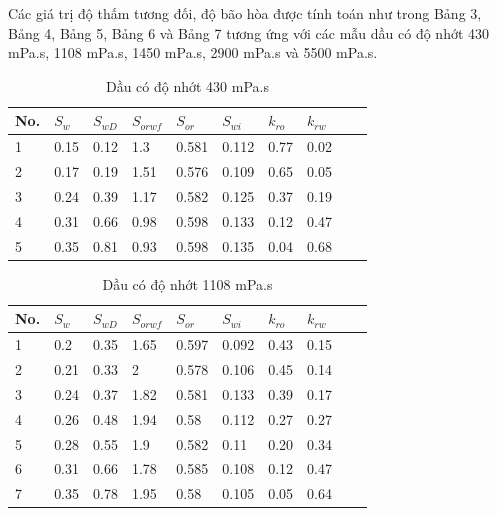 \documentclass[12pt,a4paper]{article}
\begin{document}
	\newline
	Các giá trị độ thấm tương đối, độ bão hòa được tính toán như trong Bảng 3, Bảng 4, Bảng 5, Bảng 6 và Bảng 7 tương ứng với các mẫu dầu có độ nhớt 430 mPa.s, 1108 mPa.s, 1450 mPa.s, 2900 mPa.s và 5500 mPa.s.
\begin{table}[h]
\centering
\caption{Dầu có độ nhớt 430 mPa.s}
\label{my-label}
\begin{tabularx}{\textwidth}{@{}XXXXXXXXXX@{}}
\toprule
No. & $S_w$ & $S_{wD}$ & $S_{orwf}$ & $S_{or}$ & $S_{wi}$ & $k_{ro}$ & $k_{rw}$ \\ \midrule
1   & 0.15  & 0.12     & 1.3        & 0.581    & 0.112    & 0.77     & 0.02     \\
2   & 0.17  & 0.19     & 1.51       & 0.576    & 0.109    & 0.65     & 0.05     \\
3   & 0.24  & 0.39     & 1.17       & 0.582    & 0.125    & 0.37     & 0.19     \\
4   & 0.31  & 0.66     & 0.98       & 0.598    & 0.133    & 0.12     & 0.47     \\
5   & 0.35  & 0.81     & 0.93       & 0.598    & 0.135    & 0.04     & 0.68     \\ \bottomrule
\end{tabularx}
\end{table}
\begin{table}[h]
\centering
\caption{Dầu có độ nhớt 1108 mPa.s}
\label{my-label}
\begin{tabularx}{\textwidth}{@{}XXXXXXXXXX@{}}
\toprule
No. & $S_w$ & $S_{wD}$ & $S_{orwf}$ & $S_{or}$ & $S_{wi}$ & $k_{ro}$ & $k_{rw}$ \\ \midrule
1   & 0.2   & 0.35     & 1.65       & 0.597    & 0.092    & 0.43     & 0.15     \\
2   & 0.21  & 0.33     & 2          & 0.578    & 0.106    & 0.45     & 0.14     \\
3   & 0.24  & 0.37     & 1.82       & 0.581    & 0.133    & 0.39     & 0.17     \\
4   & 0.26  & 0.48     & 1.94       & 0.58     & 0.112    & 0.27     & 0.27     \\
5   & 0.28  & 0.55     & 1.9        & 0.582    & 0.11     & 0.20     & 0.34     \\
6   & 0.31  & 0.66     & 1.78       & 0.585    & 0.108    & 0.12     & 0.47     \\
7   & 0.35  & 0.78     & 1.95       & 0.58     & 0.105    & 0.05     & 0.64     \\ \bottomrule
\end{tabularx}
\end{table}
\end{document}
